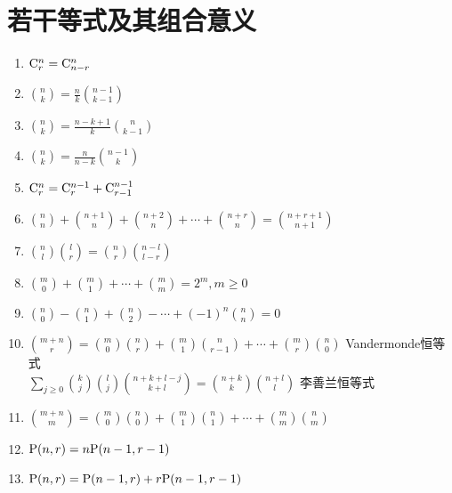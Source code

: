 \section{若干等式及其组合意义}

    \begin{enumerate}
        \item $\C^n_r=\C^n_{n-r}$
        \item ${n\choose k}=\frac nk{n-1\choose k-1}$
        \item ${n\choose k}=\frac{n-k+1}k{n\choose k-1}$
        \item ${n\choose k}=\frac n{n-k}{n-1\choose k}$
        \item $\C^n_r=\C^{n-1}_r+\C^{n-1}_{r-1}$
        \item ${n\choose n}+{n+1\choose n}+{n+2\choose n}+\cdots+{n+r\choose n}={n+r+1\choose n+1}$
        \item ${n\choose l}{l\choose r}={n\choose r}{n-l\choose l-r}$
        \item ${m\choose0}+{m\choose 1}+\cdots+{m\choose m}=2^m, m\geqslant0$
        \item ${n\choose0}-{n\choose1}+{n\choose2}-\cdots+(-1)^n{n\choose n}=0$
        \item ${m+n\choose r}={m\choose0}{n\choose r}+{m\choose1}{n\choose r-1}+\cdots+{m\choose r}{n\choose 0}$ Vandermonde恒等式 \\
        $\sum_{j\geqslant0}{k\choose j}{l\choose j}{n+k+l-j\choose k+l}={n+k\choose k}{n+l\choose l}$ 李善兰恒等式
        \item ${m+n\choose m}={m\choose0}{n\choose0}+{m\choose1}{n\choose1}+\cdots+{m\choose m}{n\choose m}$
        \item $\P(n,r)=n\P(n-1,r-1)$
        \item $\P(n,r)=\P(n-1,r)+r\P(n-1,r-1)$
    \end{enumerate}
